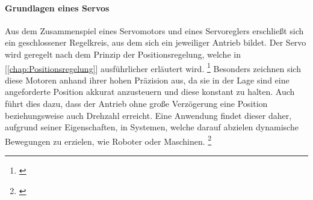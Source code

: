 \documentclass[titlepage,12pt,twoside]{article}
\begin{document}
\paragraph{Grundlagen eines Servos}
\hfill \break
\hfill \break
Aus dem Zusammenspiel eines Servomotors und eines Servoreglers 
erschließt sich ein geschlossener Regelkreis, aus dem sich ein 
jeweiliger Antrieb bildet. Der Servo wird geregelt nach dem Prinzip der 
Positionsregelung, welche in [\textcolor{blue}{\autoref{chap:Positionsregelung}}] ausführlicher 
erläutert wird. \footnote{\cite{Q6}} Besonders zeichnen sich diese Motoren anhand ihrer 
hohen Präzision aus, da sie in der Lage sind eine angeforderte Position 
akkurat anzusteuern und diese konstant zu halten. Auch führt dies dazu, 
dass der Antrieb ohne große Verzögerung eine Position beziehungsweise 
auch Drehzahl erreicht. Eine Anwendung findet dieser daher, aufgrund 
seiner Eigenschaften, in Systemen, welche darauf abzielen dynamische 
Bewegungen zu erzielen, wie Roboter oder Maschinen. \footnote{\cite{Q7}} \\
\end{document}
